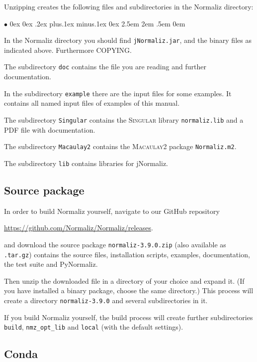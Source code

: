 \documentclass[12pt,a4paper]{scrartcl}
\newcommand{\stdli}{ \topsep0ex \partopsep0ex %
\parsep.2ex plus.1ex minus.1ex \itemsep0ex%
\leftmargin2.5em \labelwidth2em \labelsep.5em \rightmargin0em}%
\renewenvironment{itemize}{\begin{list}{{$\bullet$}}{\stdli}}{\end{list}}
\theoremstyle{definition}
\def\ttt{\texttt}
\def\version{3.9.0}
\def\NmzDir{normaliz-\version}
\begin{document}
Unzipping creates the following files and subdirectories in the Normaliz directory:

\begin{itemize}
	\item In the Normaliz directory you should
	find \ttt{jNormaliz.jar}, and the binary files as indicated above. Furthermore COPYING.
	
	\item The subdirectory \ttt{doc} contains the file you are reading
	and further documentation.
	
	\item In the subdirectory \ttt{example} there are the input
	files for some examples. It contains all named
	input files of examples of this manual.
	
	\item The subdirectory \ttt{Singular} contains the
	\textsc{Singular} library \ttt{normaliz.lib} and a PDF file with
	documentation.
	
	\item The subdirectory \ttt{Macaulay2} contains the
	\textsc{Macaulay2} package \ttt{Normaliz.m2}.
	
	\item The subdirectory \ttt{lib} contains libraries for
	jNormaliz.
\end{itemize}

\subsection{Source package}
In order to build Normaliz yourself, navigate to our GitHub repository
\begin{center}
	\url{https://github.com/Normaliz/Normaliz/releases}.
\end{center}
and download the
source package \ttt{\NmzDir.zip} (also available as \ttt{.tar.gz}) contains the source files, installation scripts, examples, documentation, the test suite and PyNormaliz.

Then unzip the downloaded file in a directory of your choice and expand it. (If you have installed a binary package, choose the same directory.)
This process will create a directory \ttt{\NmzDir} and several subdirectories in it.

If you build Normaliz yourself, the build process will create further subdirectories \verb|build|, \verb|nmz_opt_lib| and \verb|local| (with the default settings).

\subsection{Conda}
\end{document}
